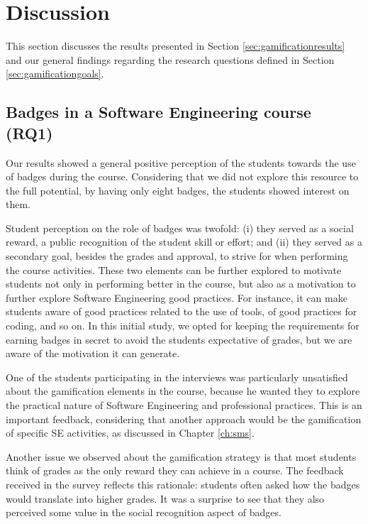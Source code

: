 \section{Discussion}
\label{sec:gamificationdiscussion}

This section discusses the results presented in Section \ref{sec:gamificationresults} and our general findings regarding the research questions defined in Section \ref{sec:gamificationgoals}.

\subsection{Badges in a Software Engineering course (RQ1)}
\label{sec:gamificationdiscussionrq1}

Our results showed a general positive perception of the students towards the use of badges during the course. Considering that we did not explore this resource to the full potential, by having only eight badges, the students showed interest on them.

Student perception on the role of badges was twofold: (i) they served as a social reward, a public recognition of the student skill or effort; and (ii) they served as a secondary goal, besides the grades and approval, to strive for when performing the course activities. These two elements can be further explored to motivate students not only in performing better in the course, but also as a motivation to further explore Software Engineering good practices. For instance, it can make students aware of good practices related to the use of tools, of good practices for coding, and so on. In this initial study, we opted for keeping the requirements for earning badges in secret to avoid the students expectative of grades, but we are aware of the motivation it can generate.

One of the students participating in the interviews was particularly unsatisfied about the gamification elements in the course, because he wanted they to explore the practical nature of Software Engineering and professional practices. This is an important feedback, considering that another approach would be the gamification of specific SE activities, as discussed in Chapter \ref{ch:sms}.

Another issue we observed about the gamification strategy is that most students think of grades as the only reward they can achieve in a course. The feedback received in the survey reflects this rationale: students often asked how the badges would translate into higher grades. It was a surprise to see that they also perceived some value in the social recognition aspect of badges.

